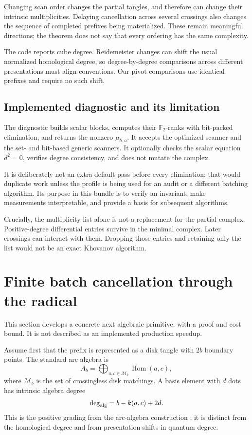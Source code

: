\documentclass[11pt,letterpaper]{article}
\theoremstyle{definition}
\newcommand{\F}{\mathbb F_2}
\newcommand{\Hom}{\operatorname{Hom}}
\begin{document}
Changing scan order changes the partial tangles, and therefore can change
their intrinsic multiplicities. Delaying cancellation across several
crossings also changes the sequence of completed prefixes being
materialized. These remain meaningful directions; the theorem does not
say that every ordering has the same complexity.

The code reports cube degree. Reidemeister changes can shift the usual
normalized homological degree, so degree-by-degree comparisons across
different presentations must align conventions. Our pivot comparisons
use identical prefixes and require no such shift.

\subsection{Implemented diagnostic and its limitation}

The diagnostic builds scalar blocks, computes their \(\F\)-ranks with
bit-packed elimination, and returns the nonzero \(\mu_{h,a}\).
It accepts the optimized scanner and the set- and bit-based generic
scanners. It optionally checks the scalar equation \(d^2=0\), verifies
degree consistency, and does not mutate the complex.

It is deliberately not an extra default pass before every elimination:
that would duplicate work unless the profile is being used for an audit
or a different batching algorithm. Its purpose in this bundle is to
verify an invariant, make measurements interpretable, and provide a
basis for subsequent algorithms.

Crucially, the multiplicity list alone is not a replacement for the
partial complex. Positive-degree differential entries survive in the
minimal complex. Later crossings can interact with them. Dropping those
entries and retaining only the list would not be an exact Khovanov
algorithm.

\section{Finite batch cancellation through the radical}
\label{sec:batch}

This section develops a concrete next algebraic primitive, with a proof
and cost bound. It is not described as an implemented production speedup.

Assume first that the prefix is represented as a disk tangle with
\(2b\) boundary points. The standard arc algebra is
\[
 A_b=\bigoplus_{a,c\in\mathcal M_b}\Hom(a,c),
\]
where \(\mathcal M_b\) is the set of crossingless disk matchings.
A basis element with \(d\) dots has intrinsic algebra degree
\begin{equation}
\label{eq:arcdegree}
              \deg_{\rm alg}=b-k(a,c)+2d.
\end{equation}
This is the positive grading from the arc-algebra construction
\cite[Section 2.4]{khovanovtangles}; it is distinct from the
homological degree and from presentation shifts in quantum degree.
\end{document}
